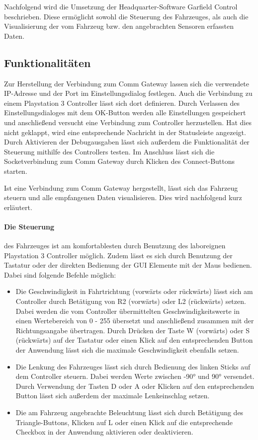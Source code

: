 Nachfolgend wird die Umsetzung der Headquarter-Software \glqq Garfield Control\grqq{} beschrieben. Diese ermöglicht sowohl die Steuerung des Fahrzeuges, als auch die Visualisierung der vom Fahrzeug bzw. den angebrachten Sensoren erfassten Daten.

\subsection{Funktionalitäten}

Zur Herstellung der Verbindung zum Comm Gateway lassen sich die verwendete IP-Adresse und der Port im Einstellungsdialog festlegen. Auch die Verbindung zu einem Playstation 3 Controller lässt sich dort definieren. Durch Verlassen des Einstellungsdialoges mit dem OK-Button werden alle Einstellungen gespeichert und anschließend versucht eine Verbindung zum Controller herzustellen. Hat dies nicht geklappt, wird eine entsprechende Nachricht in der Statusleiste angezeigt. Durch Aktivieren der Debugausgaben lässt sich außerdem die Funktionalität der Steuerung mithilfe des Controllers testen. Im Anschluss lässt sich die Socketverbindung zum Comm Gateway durch Klicken des Connect-Buttons starten.

Ist eine Verbindung zum Comm Gateway hergestellt, lässt sich das Fahrzeug steuern und alle empfangenen Daten visualisieren. Dies wird nachfolgend kurz erläutert.

\paragraph{Die Steuerung} des Fahrzeuges ist am komfortablesten durch Benutzung des laboreignen Playstation 3 Controller möglich. Zudem lässt es sich durch Benutzung der Tastatur oder der direkten Bedienung der GUI Elemente mit der Maus bedienen. Dabei sind folgende Befehle möglich:

\begin{itemize}
	\item Die Geschwindigkeit in Fahrtrichtung (vorwärts oder rückwärts) lässt sich am Controller durch Betätigung von R2 (vorwärts) oder L2 (rückwärts) setzen. Dabei werden die vom Controller übermittelten Geschwindigkeitswerte in einen Wertebereich von 0 - 255 übersetzt und anschließend zusammen mit der Richtungsangabe übertragen. Durch Drücken der Taste W (vorwärts) oder S (rückwärts) auf der Tastatur oder einen Klick auf den entsprechenden Button der Anwendung lässt sich die maximale Geschwindigkeit ebenfalls setzen.
	
	\item Die Lenkung des Fahrzeuges lässt sich durch Bedienung des linken Sticks auf dem Controller steuern. Dabei werden Werte zwischen -90° und 90° versendet. Durch Verwendung der Tasten D oder A oder Klicken auf den entsprechenden Button lässt sich außerdem der maximale Lenkeinschlag setzen.
	
	\item Die am Fahrzeug angebrachte Beleuchtung lässt sich durch Betätigung des Triangle-Buttons, Klicken auf L oder einen Klick auf die entsprechende Checkbox in der Anwendung aktivieren oder deaktivieren.
	
\end{itemize}

